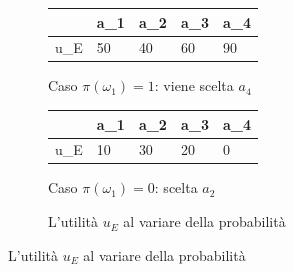 \documentclass[\main/main.tex]{subfiles}
\begin{document}
\begin{figure}
  \begin{subfigure}{0.31\textwidth}
      \begin{tabular}{|L|L|L|L|L|}
        \hline
            & a_1 & a_2 & a_3 & a_4 \\
        \hline
        u_E & 50  & 40  & 60  & 90  \\
        \hline
      \end{tabular}
      \caption{Caso $\pi(\omega_1)=1$: viene scelta $a_4$}
  \end{subfigure}
  \begin{subfigure}{0.31\textwidth}
      \begin{tabular}{|L|L|L|L|L|}
        \hline
            & a_1 & a_2 & a_3 & a_4 \\
        \hline
        u_E & 10  & 30  & 20  & 0   \\
        \hline
      \end{tabular}
      \caption{Caso $\pi(\omega_1)=0$: scelta $a_2$}
  \end{subfigure}
  \begin{subfigure}{0.31\textwidth}
    \caption{L'utilità $u_E$ al variare della probabilità}
  \end{subfigure}
\end{figure}
\end{document}
